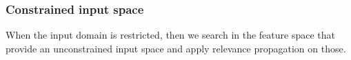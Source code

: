 \documentclass{article}
\begin{document}
	\subsubsection{Constrained input space}
	When the input domain is restricted, then we search in the feature space that provide an unconstrained input space and apply relevance propagation on those.
	
	
	
	
\end{document}
